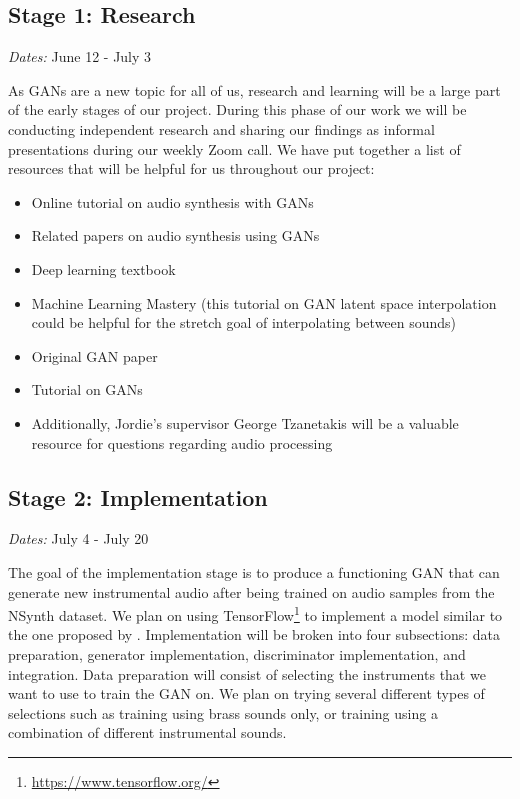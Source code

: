 \documentclass{article} %
\begin{document}
\subsection{Stage 1: Research}
\emph{Dates:} June 12 - July 3

As GANs are a new topic for all of us, research and learning will be a large part of the early stages of our project. During this phase of our work we will be conducting independent research and sharing our findings as informal presentations during our weekly Zoom call. We have put together a list of resources that will be helpful for us throughout our project:
\begin{itemize}
  \item Online tutorial on audio synthesis with GANs \citep{pasini2019syngan}
  \item Related papers on audio synthesis using GANs \citep{donahue2018adversarial, engel2018gansynth}
  \item Deep learning textbook \citep{lecun2015deep}
  \item Machine Learning Mastery (this tutorial on GAN latent space interpolation could be helpful for the stretch goal of interpolating between sounds) \citep{brownlee2019ganlatent}
  \item Original GAN paper \citep{goodfellow2014generative}
  \item Tutorial on GANs \citep{goodfellow2016nips}
  \item Additionally, Jordie's supervisor George Tzanetakis will be a valuable resource for questions regarding audio processing
\end{itemize}

\subsection{Stage 2: Implementation}
\emph{Dates:} July 4 - July 20

The goal of the implementation stage is to produce a functioning GAN that can generate new instrumental audio after being trained on audio samples from the NSynth dataset. We plan on using TensorFlow\footnote{\url{https://www.tensorflow.org/}} to implement a model similar to the one proposed by \citep{donahue2018adversarial}. Implementation will be broken into four subsections: data preparation, generator implementation, discriminator implementation, and integration. Data preparation will consist of selecting the instruments that we want to use to train the GAN on. We plan on trying several different types of selections such as training using brass sounds only, or training using a combination of different instrumental sounds.
\end{document}
